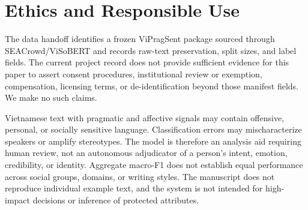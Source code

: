 \section{Ethics and Responsible Use}

The data handoff identifies a frozen ViPragSent package sourced through SEACrowd/ViSoBERT and records raw-text preservation, split sizes, and label fields. The current project record does not provide sufficient evidence for this paper to assert consent procedures, institutional review or exemption, compensation, licensing terms, or de-identification beyond those manifest fields. We make no such claims.

Vietnamese text with pragmatic and affective signals may contain offensive, personal, or socially sensitive language. Classification errors may mischaracterize speakers or amplify stereotypes. The model is therefore an analysis aid requiring human review, not an autonomous adjudicator of a person's intent, emotion, credibility, or identity. Aggregate macro-F1 does not establish equal performance across social groups, domains, or writing styles. The manuscript does not reproduce individual example text, and the system is not intended for high-impact decisions or inference of protected attributes.
